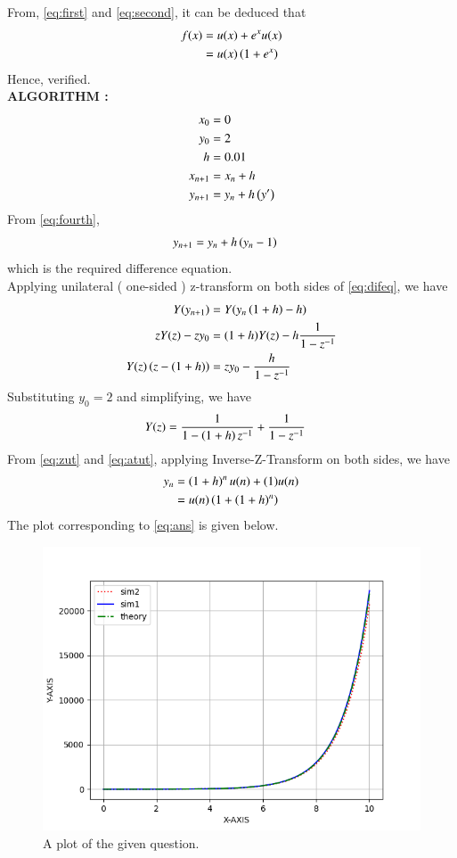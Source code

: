 \documentclass[journal]{IEEEtran}
\begin{document}
From, \eqref{eq:first} and \eqref{eq:second}, it can be deduced that
\begin{align}
	f(x) &= u(x) + e^x u(x) \\
	&= u(x) \left(1 + e^x\right)
\end{align}
Hence, verified. \\
\textbf{ALGORITHM :} \\
\begin{align}
	 x_0 &= 0 \\
	 y_0 &= 2 \\
	 h &= 0.01 \\
	 x_{n+1} &= x_{n} + h \\
	 y_{n+1} &= y_{n} + h \left(y^{\prime}\right) 
\end{align}
From \eqref{eq:fourth}, 
\begin{align}
	y_{n+1} &= y_{n} + h \left(y_{n} - 1\right) \label{eq:difeq}
\end{align}
which is the required difference equation. \\
Applying unilateral ( one-sided ) z-transform on both sides of \eqref{eq:difeq}, we have
\begin{align}
	Y(y_{n+1}) &= Y(y_{n} \left(1+h\right) - h) \\
	z Y(z) - z y_{0} &= (1+h) Y(z) - h \frac{1}{1 - z^{-1}} \\
	Y(z) \left(z - (1+h)\right) &= z y_{0} - \frac{h}{1 - z^{-1}} 
\end{align}
Substituting $y_{0} = 2$ and simplifying, we have
\begin{align}
	Y(z) &= \frac{1}{1 - \left(1+h\right) z^{-1}} + \frac{1}{1 - z^{-1}}
\end{align}
From \eqref{eq:zut} and \eqref{eq:atut}, applying Inverse-Z-Transform on both sides, we have 
\begin{align}
	y_{n} &= \left(1+h\right)^{n} u(n) + (1) u(n)	\\
	 &= u(n) \left(1 + \left(1+h\right)^{n}\right) \label{eq:ans}
\end{align}
The plot corresponding to \eqref{eq:ans} is given below.

\begin{figure}[h]
				 \centering
				 \includegraphics[width=\columnwidth]{figs/fig.png}
				 \caption{A plot of the given question.}
				 \label{fig:Plot1}
			 \end{figure}
\end{document}
